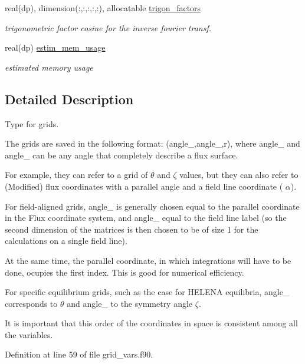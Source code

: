 \begin{DoxyCompactItemize}
real(dp), dimension(\+:,\+:,\+:,\+:,\+:), allocatable \hyperlink{structgrid__vars_1_1grid__type_adebef5699de49c33289e03cda2875232}{trigon\+\_\+factors}
\begin{DoxyCompactList}\small\item\em trigonometric factor cosine for the inverse fourier transf. \end{DoxyCompactList}\item 
real(dp) \hyperlink{structgrid__vars_1_1grid__type_a18ae7f2f277c6aea8402fdc81a7d58f6}{estim\+\_\+mem\+\_\+usage}
\begin{DoxyCompactList}\small\item\em estimated memory usage \end{DoxyCompactList}\end{DoxyCompactItemize}


\subsection{Detailed Description}
Type for grids. 

The grids are saved in the following format\+: {\ttfamily (angle\+\_,angle\+\_,r)}, where {\ttfamily angle\+\_} and {\ttfamily angle\+\_} can be any angle that completely describe a flux surface.

For example, they can refer to a grid of $\theta$ and $\zeta$ values, but they can also refer to (Modified) flux coordinates with a parallel angle and a field line coordinate ( $\alpha$).

For field-\/aligned grids, {\ttfamily angle\+\_} is generally chosen equal to the parallel coordinate in the Flux coordinate system, and {\ttfamily angle\+\_} equal to the field line label (so the second dimension of the matrices is then chosen to be of size 1 for the calculations on a single field line).

At the same time, the parallel coordinate, in which integrations will have to be done, ocupies the first index. This is good for numerical efficiency.

For specific equilibrium grids, such as the case for H\+E\+L\+E\+NA equilibria, {\ttfamily angle\+\_} corresponds to $\theta$ and {\ttfamily angle\+\_} to the symmetry angle $\zeta$.

It is important that this order of the coordinates in space is consistent among all the variables. 

Definition at line 59 of file grid\+\_\+vars.\+f90.



